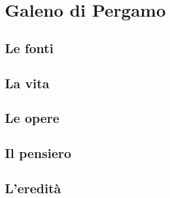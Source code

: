 \chapter{Galeno di Pergamo}

\section{Le fonti}

\section{La vita}

\section{Le opere}

\section{Il pensiero}

\section{L'eredità}
